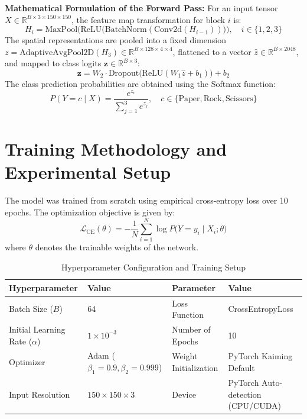 \documentclass[11pt,a4paper]{article}
\begin{document}
\noindent \textbf{Mathematical Formulation of the Forward Pass:}
For an input tensor $X \in \mathbb{R}^{B \times 3 \times 150 \times 150}$, the feature map transformation for block $i$ is:
\begin{equation}
    H_i = \text{MaxPool}\Big(\text{ReLU}\big(\text{BatchNorm}(\text{Conv2d}(H_{i-1}))\big)\Big), \quad i \in \{1, 2, 3\}
\end{equation}
The spatial representations are pooled into a fixed dimension $z = \text{AdaptiveAvgPool2D}(H_3) \in \mathbb{R}^{B \times 128 \times 4 \times 4}$, flattened to a vector $\hat{z} \in \mathbb{R}^{B \times 2048}$, and mapped to class logits $\mathbf{z} \in \mathbb{R}^{B \times 3}$:
\begin{equation}
    \mathbf{z} = W_2 \cdot \text{Dropout}\big(\text{ReLU}(W_1 \hat{z} + b_1)\big) + b_2
\end{equation}
The class prediction probabilities are obtained using the Softmax function:
\begin{equation}
    P(Y = c \mid X) = \frac{e^{z_c}}{\sum_{j=1}^{3} e^{z_j}}, \quad c \in \{\text{Paper}, \text{Rock}, \text{Scissors}\}
\end{equation}

\section{Training Methodology and Experimental Setup}
The model was trained from scratch using empirical cross-entropy loss over 10 epochs. The optimization objective is given by:
\begin{equation}
    \mathcal{L}_{\text{CE}}(\theta) = -\frac{1}{N}\sum_{i=1}^{N} \log P\big(Y = y_i \mid X_i; \theta\big)
\end{equation}
where $\theta$ denotes the trainable weights of the network.

\begin{table}[h!]
\centering
\small
\caption{Hyperparameter Configuration and Training Setup}
\label{tab:hyperparams}
\begin{tabular}{@{}ll|ll@{}}
\toprule
\textbf{Hyperparameter} & \textbf{Value} & \textbf{Parameter} & \textbf{Value} \\ \midrule
Batch Size ($B$) & 64 & Loss Function & CrossEntropyLoss \\
Initial Learning Rate ($\alpha$) & $1 \times 10^{-3}$ & Number of Epochs & 10 \\
Optimizer & Adam ($\beta_1=0.9, \beta_2=0.999$) & Weight Initialization & PyTorch Kaiming Default \\
Input Resolution & $150 \times 150 \times 3$ & Device & PyTorch Auto-detection (CPU/CUDA) \\
\bottomrule
\end{tabular}
\end{table}
\end{document}
